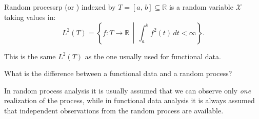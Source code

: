 \begin{definition}{Random process}{rp} (or )
	indexed by $T = [a,\,b] \subseteq \mathds R$
	is a random variable $\boldsymbol{\mathcal X}$ taking values in:
	\begin{equation*}
		L^2(T) = \left\{ f : T \to \mathds R \,\middle|\, \int_a^b f^2(t) \,dt < \infty \right\}.
	\end{equation*}
    \tcblower

    This is the same $L^2(T)$ as the one usually used for functional data.
\end{definition}

\begin{question*}{What is the difference between a functional data and a random process?}

	In random process analysis it is usually assumed that we can observe
    only \emph{one} realization of the process, while in functional data analysis
	it is always assumed that independent observations from the random
	process are available.
\end{question*}


